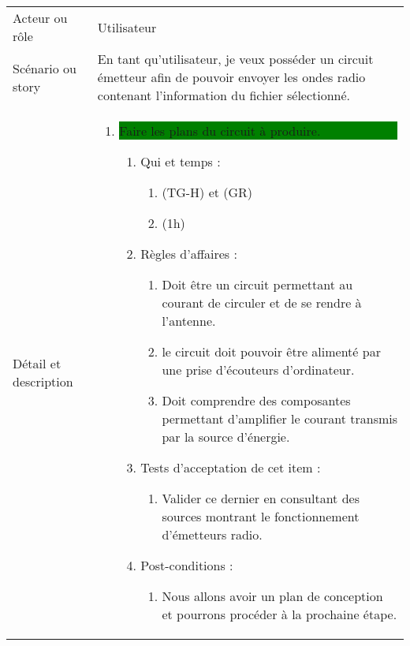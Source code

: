 \begin{longtable}{|l|p{}|}
\hline
    \rowcolor{Gray}
    \multicolumn{2}{|l|}{3} \\
\hline
    Acteur ou rôle & Utilisateur \\
\hline
    Scénario ou story & En tant qu’utilisateur, je veux posséder un circuit
    émetteur afin de pouvoir envoyer les ondes radio contenant l’information
    du fichier sélectionné. \\
\hline
    Détail et description &
        \begin{enumerate}[label*=\arabic*.]
        \item \colorbox{Green}{\parbox{13cm}{Faire les plans du circuit à produire.}}
            \begin{enumerate}[label*=\arabic*.]
                    \item Qui et temps :
                    \begin{enumerate}[label*=\arabic*.]
                        \item (TG-H) et (GR)
                        \item (1h)
                    \end{enumerate}
                    \item Règles d’affaires :
                    \begin{enumerate}[label*=\arabic*.]
                        \item Doit être un circuit permettant au courant de circuler et de se rendre à l'antenne.
                        \item le circuit doit pouvoir être alimenté par une prise d'écouteurs d'ordinateur.
                        \item Doit comprendre des composantes permettant d'amplifier le courant transmis par la source d'énergie.
                    \end{enumerate}
                    \item Tests d'acceptation de cet item :
                    \begin{enumerate}[label*=\arabic*.]
                        \item Valider ce dernier en consultant des sources montrant le fonctionnement d'émetteurs radio. 
                    \end{enumerate}
                    \item Post-conditions :
                    \begin{enumerate}[label*=\arabic*.]
                        \item Nous allons avoir un plan de conception et pourrons procéder à la prochaine étape.

\end{enumerate}
\end{enumerate}
\end{enumerate}
\end{longtable}
